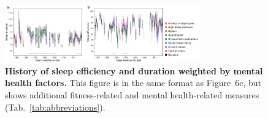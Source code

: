 \documentclass[10pt]{article}
\newcommand{\dynamics}{6}
\begin{document}
\begin{figure}[p]
  \centering
  \includegraphics[width=0.75\textwidth]{figs/weighted_timecourse_sleep_MH}
\caption{\textbf{History of sleep efficiency and duration weighted by
    mental health factors.} This figure is in the same format as
  Figure~\dynamics c, but shows additional fitness-related and mental
  health-related measures (Tab.~\ref{tab:abbreviations}).}
\label{fig:sleep_timecourse_MH}
  \end{figure}

  \clearpage
  \newpage


\end{document}
